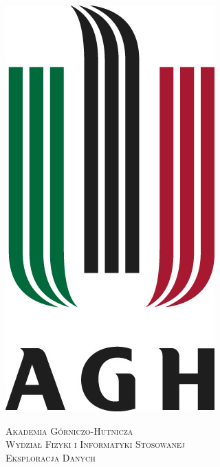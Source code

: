 \documentclass[a4paper,10pt,table]{article}
\begin{document}

\begin{titlepage}

\newcommand{\HRule}{\rule{\linewidth}{0.5mm}} %

\center %
 

\begin{center}
\includegraphics[scale=0.5]{agh.JPG}
\end{center}
\vspace*{10mm}
\textsc{\LARGE Akademia Górniczo-Hutnicza}\\[1.5cm] %
\textsc{\Large Wydział Fizyki i Informatyki Stosowanej}\\[0.5cm] %
\textsc{\large Eksploracja Danych}\\[0.5cm] %


\end{titlepage}
\end{document}
